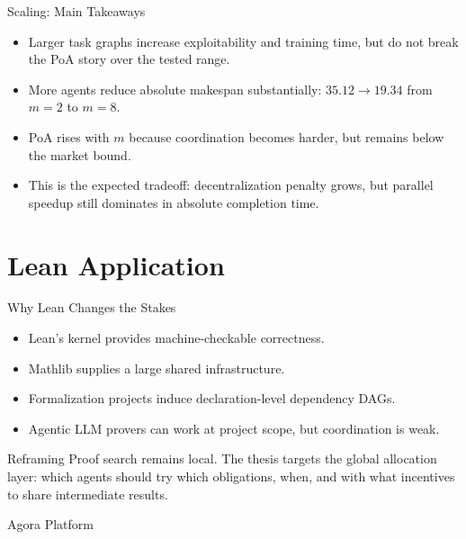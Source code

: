 \documentclass[10pt,aspectratio=169]{beamer}
\begin{document}
\begin{frame}{Scaling: Main Takeaways}
\small
\begin{itemize}
  \item Larger task graphs increase exploitability and training time, but do not break the PoA story over the tested range.
  \item More agents reduce absolute makespan substantially: $35.12\to 19.34$ from $m=2$ to $m=8$.
  \item PoA rises with $m$ because coordination becomes harder, but remains below the market bound.
  \item This is the expected tradeoff: decentralization penalty grows, but parallel speedup still dominates in absolute completion time.
\end{itemize}
\end{frame}

\section{Lean Application}

\begin{frame}{Why Lean Changes the Stakes}
\small
\begin{itemize}
  \item Lean's kernel provides machine-checkable correctness.
  \item Mathlib supplies a large shared infrastructure.
  \item Formalization projects induce declaration-level dependency DAGs.
  \item Agentic LLM provers can work at project scope, but coordination is weak.
\end{itemize}

\begin{block}{Reframing}
Proof search remains local. The thesis targets the global allocation layer: which agents should try which obligations, when, and with what incentives to share intermediate results.
\end{block}
\end{frame}

\begin{frame}[plain,shrink=27]{Agora Platform}



\end{frame}
\end{document}
